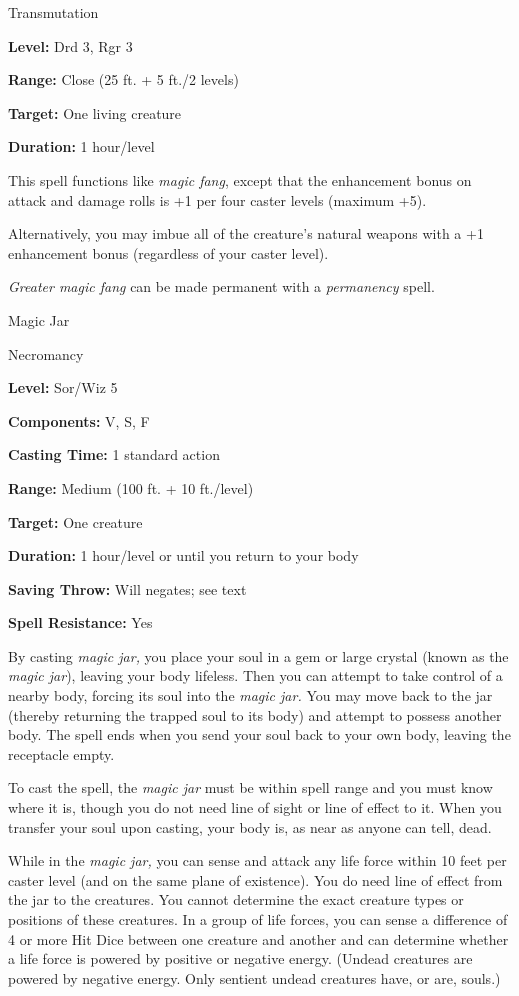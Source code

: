 \documentclass{article}
\begin{document}
Transmutation

\textbf{Level:} Drd 3, Rgr 3

\textbf{Range:} Close (25 ft. + 5 ft./2 levels)

\textbf{Target:} One living creature

\textbf{Duration:} 1 hour/level

This spell functions like \textit{magic fang}, except that the enhancement bonus 
on attack and damage rolls is +1 per four caster levels (maximum +5).

Alternatively, you may imbue all of the creature's natural weapons with a +1 enhancement 
bonus (regardless of your caster level).

\textit{Greater magic fang }can be made permanent with a \textit{permanency }spell.

\vspace{12pt}
Magic Jar

Necromancy

\textbf{Level:} Sor/Wiz 5

\textbf{Components:} V, S, F

\textbf{Casting Time:} 1 standard action

\textbf{Range:} Medium (100 ft. + 10 ft./level)

\textbf{Target:} One creature

\textbf{Duration:} 1 hour/level or until you return to your body

\textbf{Saving Throw: }Will negates; see text

\textbf{Spell Resistance:} Yes

By casting \textit{magic jar, }you place your soul in a gem or large crystal (known 
as the \textit{magic jar}), leaving your body lifeless. Then you can attempt to 
take control of a nearby body, forcing its soul into the \textit{magic jar. }You 
may move back to the jar (thereby returning the trapped soul to its body) and attempt 
to possess another body. The spell ends when you send your soul back to your own 
body, leaving the receptacle empty.

To cast the spell, the \textit{magic jar }must be within spell range and you must 
know where it is, though you do not need line of sight or line of effect to it. 
When you transfer your soul upon casting, your body is, as near as anyone can tell, 
dead. 

While in the \textit{magic jar, }you can sense and attack any life force within 
10 feet per caster level (and on the same plane of existence). You do need line 
of effect from the jar to the creatures. You cannot determine the exact creature 
types or positions of these creatures. In a group of life forces, you can sense 
a difference of 4 or more Hit Dice between one creature and another and can determine 
whether a life force is powered by positive or negative energy. (Undead creatures 
are powered by negative energy. Only sentient undead creatures have, or are, souls.)
\end{document}
